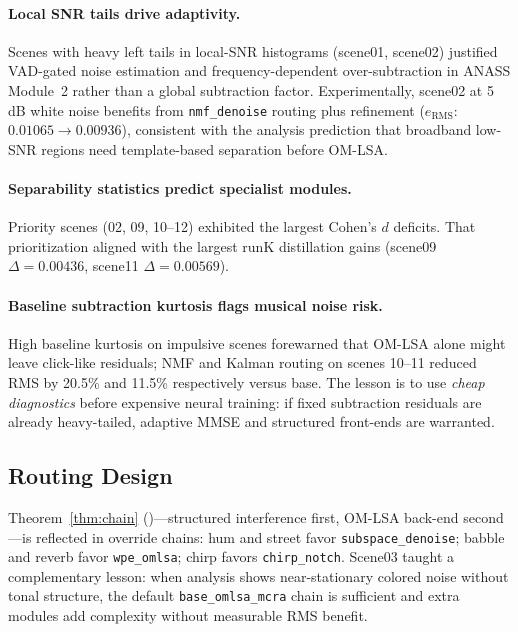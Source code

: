 \paragraph{Local SNR tails drive adaptivity.}
Scenes with heavy left tails in local-SNR histograms (scene01, scene02) justified VAD-gated noise estimation and frequency-dependent over-subtraction in ANASS Module~2 rather than a global subtraction factor. Experimentally, scene02 at 5\,dB white noise benefits from \texttt{nmf\_denoise} routing plus refinement ($e_{\mathrm{RMS}}$: $0.01065 \to 0.00936$), consistent with the analysis prediction that broadband low-SNR regions need template-based separation before OM-LSA.

\paragraph{Separability statistics predict specialist modules.}
Priority scenes (02, 09, 10--12) exhibited the largest Cohen's $d$ deficits. That prioritization aligned with the largest runK distillation gains (scene09 $\Delta=0.00436$, scene11 $\Delta=0.00569$).

\paragraph{Baseline subtraction kurtosis flags musical noise risk.}
High baseline kurtosis on impulsive scenes forewarned that OM-LSA alone might leave click-like residuals; NMF and Kalman routing on scenes 10--11 reduced RMS by 20.5\% and 11.5\% respectively versus base. The lesson is to use \emph{cheap diagnostics} before expensive neural training: if fixed subtraction residuals are already heavy-tailed, adaptive MMSE and structured front-ends are warranted.

\subsection{Routing Design}

Theorem~\ref{thm:chain} ()---structured interference first, OM-LSA back-end second---is reflected in override chains: hum and street favor \texttt{subspace\_denoise}; babble and reverb favor \texttt{wpe\_omlsa}; chirp favors \texttt{chirp\_notch}. Scene03 taught a complementary lesson: when analysis shows near-stationary colored noise without tonal structure, the default \texttt{base\_omlsa\_mcra} chain is sufficient and extra modules add complexity without measurable RMS benefit.


